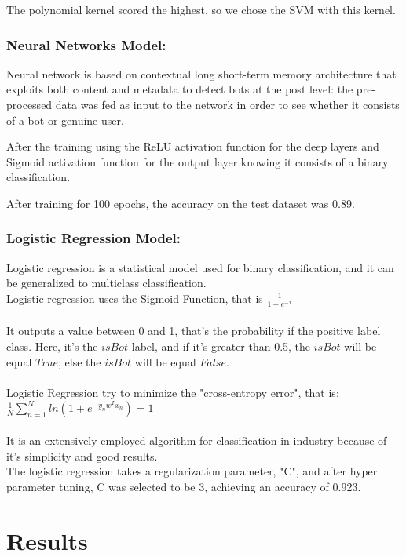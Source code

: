 \documentclass{article}
\begin{document}
    The polynomial kernel scored the highest, so we chose the SVM with this kernel.
       

    \subsubsection{Neural Networks Model:}
    
    Neural network is based on contextual long short-term memory architecture that exploits both content and metadata to detect bots at the post level: the pre-processed data was fed as  input to the network in order to see whether it consists of a bot or genuine user. 
    
    After the training using the ReLU activation function for the deep layers and Sigmoid activation function for the output layer knowing it consists of a binary classification.
    
    After training for 100 epochs, the accuracy on the test dataset was 0.89.
    
    \subsubsection{Logistic Regression Model:}
    
    Logistic regression is a statistical model used for binary classification, and it can be generalized to multiclass classification. \\
Logistic regression uses the Sigmoid Function, that is $\frac{1}{1+e^{-x}}$\\ \\ It outputs a value between 0 and 1, that's the probability if the positive label class. Here, it's the $isBot$ label, and if it's greater than 0.5, the $isBot$ will be equal $True$, else the $isBot$ will be equal $False$.  \\ \\
Logistic Regression try to minimize the "cross-entropy error", that is:\\ $\frac{1}{N} \sum_{n=1}^{N} ln(1 + e^ {-y_{n}w^Tx_n}) = 1$\\ \\
It is an extensively employed algorithm for classification in industry because of it's simplicity and good results. \\
The logistic regression takes a regularization parameter, "C", and after hyper parameter tuning, C was selected to be 3, achieving an accuracy of 0.923. 
        

\section{Results}
    
\end{document}
